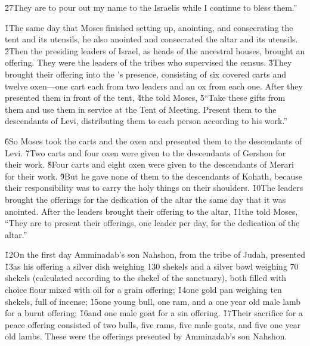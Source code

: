 \v{27}They are to pour out my name to the Israelis while I continue to bless them.''

\v{1}The same day that Moses finished setting up, anointing, and consecrating the tent and its utensils, he also anointed and consecrated the altar and its utensils. \v{2}Then the presiding leaders of Israel, as heads of the ancestral houses, brought an offering. They were the leaders of the tribes who supervised the census. \v{3}They brought their offering into the 's presence, consisting of six covered carts and twelve oxen---one cart each from two leaders and an ox from each one. After they presented them in front of the tent, \v{4}the  told Moses, \v{5}``Take these gifts from them and use them in service at the Tent of Meeting. Present them to the descendants of Levi, distributing them to each person according to his work.''

\v{6}So Moses took the carts and the oxen and presented them to the descendants of Levi. \v{7}Two carts and four oxen were given to the descendants of Gershon for their work. \v{8}Four carts and eight oxen were given to the descendants of Merari for their work. \v{9}But he gave none of them to the descendants of Kohath, because their responsibility was to carry the holy things on their shoulders. \v{10}The leaders brought the offerings for the dedication of the altar the same day that it was anointed. After the leaders brought their offering to the altar, \v{11}the  told Moses, ``They are to present their offerings, one leader per day, for the dedication of the altar.''

\v{12}On the first day Amminadab's son Nahshon, from the tribe of Judah, presented \v{13}as his offering a silver dish weighing 130 shekels and a silver bowl weighing 70 shekels (calculated according to the shekel of the sanctuary), both filled with choice flour mixed with oil for a grain offering; \v{14}one gold pan weighing ten shekels, full of incense; \v{15}one young bull, one ram, and a one year old male lamb for a burnt offering; \v{16}and one male goat for a sin offering. \v{17}Their sacrifice for a peace offering consisted of two bulls, five rams, five male goats, and five one year old lambs. These were the offerings presented by Amminadab's son Nahshon.

